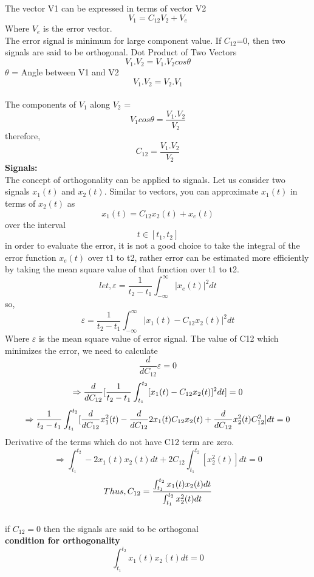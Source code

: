 \documentclass[a4paper,12pt]{book}
\begin{document}
The vector V1 can be expressed in terms of vector V2
$$V_1= C_{12}V_2 + V_e$$
Where $V_e$ is the error vector.\\
The error signal is minimum for large component value. If $C_{12}$=0, then two signals are said to be orthogonal. 
Dot Product of Two Vectors 
$$V_1 . V_2 = V_1.V_2 cos\theta$$
$\theta$ = Angle between V1 and V2 
$$V_1 . V_2 =V_2.V_1$$\\
The components of $V_1$ along $ V_2$ = 
$$V_1cos \theta = \frac{V_1.V_2}{V_2}$$
therefore, $$C_{12}=\frac{V_1.V_2}{V_2}$$
{\bf Signals:}\\
The concept of orthogonality can be applied to signals. Let us consider two signals $x_1(t)$ and $x_2(t)$. Similar to vectors, you can approximate $x_1(t)$ in terms of $x_2(t)$ as 
$$x_1(t)= C_{12}x_2(t) + x_e(t)$$
over the interval $$ t \in [t_1,t_2]$$
in order to evaluate the error, it is not a good choice to take the integral of the error function $x_e(t)$ over t1 to t2, rather error can be estimated more efficiently by taking the mean square value of that function over t1 to t2.
\begin{equation}let, \varepsilon = \frac{1}{t_2 - t_1}\int_{-\infty}^{\infty}|x_e(t)|^2dt\end{equation}
so, $$\varepsilon = \frac{1}{t_2 - t_1}\int_{-\infty}^{\infty}|x_1(t)-C_{12}x_2(t)|^2dt$$
Where $\varepsilon$ is the mean square value of error signal. The value of C12 which minimizes the error, we need to calculate $$\frac{d}{dC_{12}}\varepsilon=0$$
$$\Rightarrow {d \over dC_{12} } [ {1 \over t_2 - t_1 } \int_{t_1}^{t_2} [x_1 (t) - C_{12} x_2 (t)]^2 dt]= 0$$
$$\Rightarrow {1 \over {t_2 - t_1}} \int_{t_1}^{t_2} [  {d \over dC_{12} } x_{1}^2(t) - {d \over dC_{12} } 2x_1(t)C_{12}x_2(t)+ {d \over dC_{12} } x_{2}^{2} (t) C_{12}^2 ] dt =0$$
Derivative of the terms which do not have C12 term are zero.
$$\Rightarrow \int_{t_1}^{t_2} - 2x_1(t) x_2(t) dt + 2C_{12}\int_{t_1}^{t_2}[x_{2}^{2} (t)]dt = 0$$
\begin{equation}Thus,C_{12} = {{\int_{t_1}^{t_2}x_1(t)x_2(t)dt } \over {\int_{t_1}^{t_2} x_{2}^{2} (t)dt }}\end{equation}\\
if $C_{12}=0$ then the signals are said to be orthogonal\smallskip\\
{\bf condition for orthogonality}
\begin{equation} \int_{t_1}^{t_2} x_1 (t)x_2(t) dt = 0\end{equation}
\end{document}
